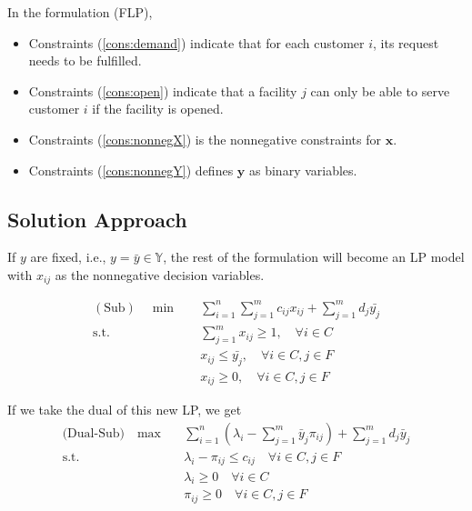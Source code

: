                 In the formulation (FLP), 
                \begin{itemize}
                    \item Constraints (\ref{cons:demand}) indicate that for each customer $i$, its request needs to be fulfilled.
                    \item Constraints (\ref{cons:open}) indicate that a facility $j$ can only be able to serve customer $i$ if the facility is opened.
                    \item Constraints (\ref{cons:nonnegX}) is the nonnegative constraints for $\mathbf{x}$.
                    \item Constraints (\ref{cons:nonnegY}) defines $\mathbf{y}$ as binary variables.
                \end{itemize}

            \subsection{Solution Approach}
                If $y$ are fixed, i.e., $y = \bar{y} \in \mathbb{Y}$, the rest of the formulation will become an LP model with $x_{ij}$ as the nonnegative decision variables. 

                \begin{align*}
                    (\text{Sub}) \quad \min \quad & \sum_{i = 1}^n \sum_{j = 1}^m c_{ij} x_{ij} + \sum_{j = 1}^m d_j \bar{y_j}\\
                    \text{s.t.} \quad &\sum_{j = 1}^m x_{ij} \ge 1, \quad \forall i \in C\\
                        &x_{ij} \le \bar{y_j}, \quad \forall i \in C, j \in F\\
                        &x_{ij} \ge 0, \quad \forall i \in C, j \in F
                \end{align*}

                If we take the dual of this new LP, we get
                \begin{align*}
                    \text{(Dual-Sub)} \quad \max \quad & \sum_{i = 1}^n (\lambda_i - \sum_{j = 1}^m \bar{y}_j \pi_{ij}) + \sum_{j = 1}^m d_j \bar{y}_j \\
                    \text{s.t.} \quad & \lambda_i - \pi_{ij} \le c_{ij} \quad \forall i \in C, j \in F\\
                    & \lambda_i \ge 0\quad \forall i \in C\\
                    & \pi_{ij} \ge 0 \quad \forall i \in C, j \in F
                \end{align*}


